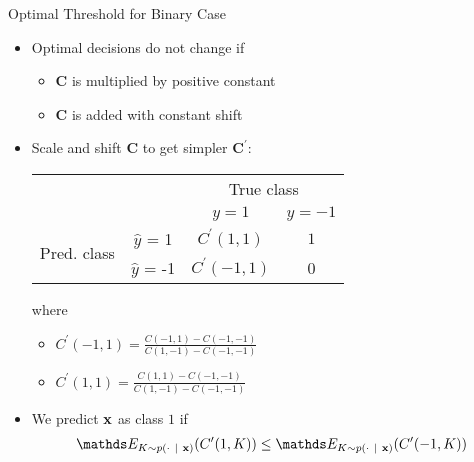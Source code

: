 \documentclass[11pt,compress,t,notes=noshow, xcolor=table]{beamer}
\begin{document}
\begin{vbframe}{Optimal Threshold for Binary Case}
		\begin{itemize}
            \item Optimal decisions do not change if 
            \begin{itemize}
                \item $\mathbf{C}$ is multiplied by positive constant
                \item $\mathbf{C}$ is added with constant shift
            \end{itemize}

            \item Scale and shift $\mathbf{C}$ to get simpler $\mathbf{C}^\prime$: 
            \begin{table}[]
                \centering
                    \begin{tabular}{cc|cc}
        			& &\multicolumn{2}{c}{True class} \\
        			& & $y=1$ & $y=-1$  \\
        			\hline
        			\multirow{2}{*}{\parbox{0.5cm}{Pred.  class}} & $\hat y$ = 1 & $C^\prime(1,1)$ & $1$ \\
        			& $\hat y$ = -1 & $C^\prime(-1, 1)$ & 0\\
                \end{tabular}
            \end{table}
            where 
            \begin{itemize}
                \item $C^\prime (-1, 1) = \frac{C(-1, 1) - C(-1, -1)}{C(1, -1) - C(-1, -1)}$
                \item $C^\prime (1, 1) = \frac{C(1, 1) - C(-1, -1)}{C(1, -1) - C(-1,-1)}$
            \end{itemize}

            \item We predict $\mathbf{x}$ as class $1$ if 
            \begin{align*}
                \E_{K \sim p(\cdot ~|~ \xv)}( C^\prime(1,K) )  \leq \E_{K \sim p(\cdot ~|~ \xv)}( C^\prime(-1,K) ) \\
            \end{align*}


\end{itemize}
\end{vbframe}
\end{document}
